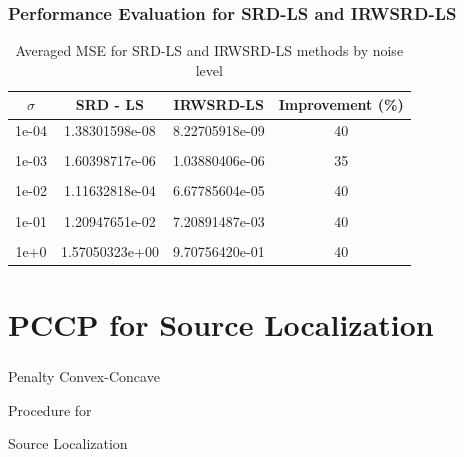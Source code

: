 \documentclass [t] {beamer} %
\begin{document}
\begin{frame} %
\frametitle{Performance Evaluation for SRD-LS and IRWSRD-LS} 
\normalsize

\begin{table}
\caption{Averaged MSE for SRD-LS and IRWSRD-LS methods by noise level}
\begin{tabular}{|c|c|c|c|}
\toprule
\textbf{$\sigma$ } & \textbf{SRD - LS} & \textbf{IRWSRD-LS } & \textbf{Improvement (\%)}\\
\midrule
1e-04&	1.38301598e-08&	8.22705918e-09& 40\\ &&&\\
1e-03&	1.60398717e-06&	1.03880406e-06& 35\\ &&&\\
1e-02&	1.11632818e-04&	6.67785604e-05& 40\\ &&&\\
1e-01&	1.20947651e-02&	7.20891487e-03& 40\\ &&&\\
1e+0&	1.57050323e+00&	9.70756420e-01& 40\\ %
\bottomrule
\end{tabular}
\end{table}
\end{frame}

\section[Chapter 3]{PCCP for Source Localization}

\begin{frame} [noframenumbering]
\frametitle{  }
\phantom{m} 
\phantom{m}
\phantom{m} 
\phantom{m}
\phantom{m} 
\Huge{\centerline{Penalty Convex-Concave}}

\Huge{\centerline{Procedure for}}

\Huge{\centerline{Source Localization}}

\end{frame}
\end{document}
